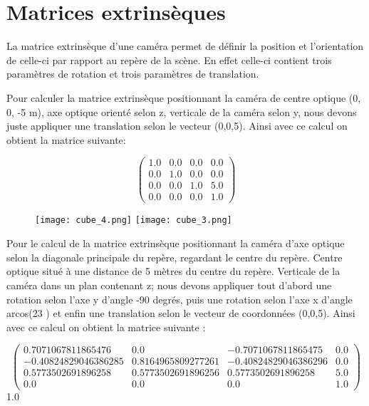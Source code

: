 \documentclass[a4paper,12pt]{report}
\begin{document}
\newpage

\section*{Matrices extrinsèques}
La matrice extrinsèque d’une caméra permet de définir la position et l’orientation de celle-ci par rapport au repère de la scène. En effet celle-ci contient trois paramètres de rotation et trois paramètres de translation.

Pour calculer la matrice extrinsèque positionnant la caméra de centre optique (0, 0, -5 m), axe optique orienté selon z, verticale de la caméra selon y, nous devons juste appliquer une translation selon le vecteur (0,0,5). Ainsi avec ce calcul on obtient la matrice suivante:

\[
   \left (
   \begin{array}{cccc}
      1.0 &   0.0  &  0.0  &  0.0\\
0.0  &  1.0  &  0.0  &  0.0\\
0.0  &  0.0  &  1.0  &  5.0\\
0.0  &  0.0 &   0.0  &  1.0
   \end{array}
   \right )
\]



\begin{figure}[!ht]
\center
	\texttt{[image: cube\_4.png]}
	\texttt{[image: cube\_3.png]}
\end{figure}

Pour le calcul de la matrice extrinsèque positionnant la caméra d’axe optique selon la diagonale principale du repère, regardant le centre du repère. Centre optique situé à une distance de 5 mètres du centre du repère. Verticale de la caméra dans un plan contenant z; nous devons appliquer tout d’abord une rotation selon l’axe y d’angle -90 degrés, puis une rotation selon l’axe x d’angle arcos(23 ) et enfin une translation selon le vecteur de coordonnées (0,0,5). Ainsi avec ce calcul on obtient la matrice suivante :

\[
   \left (
   \begin{array}{cccc}
      0.7071067811865476 & 0.0 &  -0.7071067811865475     &  0.0\\
-0.40824829046386285     &     0.8164965809277261      &      -0.40824829046386296    & 0.0\\
0.5773502691896258       &      0.5773502691896256      &      0.5773502691896258       & 5.0\\
0.0          &                                 0.0                                         & 0.0                         &             1.0
   \end{array}
   \right )
\]                                1.0
\end{document}
